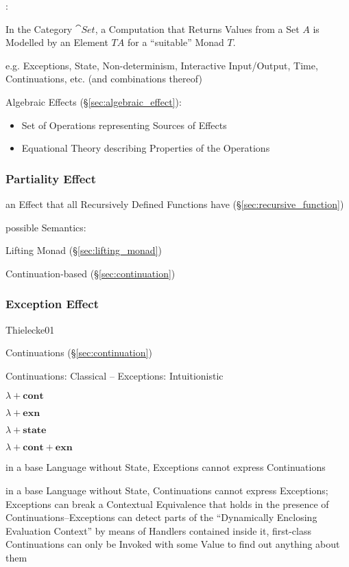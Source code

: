 \cite{plotkin-pretnar13}:

In the Category $\cat{Set}$, a Computation that Returns Values from a
Set $A$ is Modelled by an Element $T A$ for a ``suitable'' Monad $T$.

e.g. Exceptions, State, Non-determinism, Interactive Input/Output,
Time, Continuations, etc. (and combinations thereof)

Algebraic Effects (\S\ref{sec:algebraic_effect}):
\begin{itemize}
  \item Set of Operations representing Sources of Effects
  \item Equational Theory describing Properties of the Operations
\end{itemize}



\subsubsection{Partiality Effect}\label{sec:partiality_effect}

an Effect that all Recursively Defined Functions have
(\S\ref{sec:recursive_function})

possible Semantics:

Lifting Monad (\S\ref{sec:lifting_monad})

Continuation-based (\S\ref{sec:continuation})



\subsubsection{Exception Effect}\label{sec:exception_effect}

Thielecke01

Continuations (\S\ref{sec:continuation})

Continuations: Classical -- Exceptions: Intuitionistic

$\lambda + \mathbf{cont}$

$\lambda + \mathbf{exn}$

$\lambda + \mathbf{state}$

$\lambda + \mathbf{cont} + \mathbf{exn}$

in a base Language without State, Exceptions cannot express
Continuations

in a base Language without State, Continuations cannot express
Exceptions; Exceptions can break a Contextual Equivalence that holds
in the presence of Continuations--Exceptions can detect parts of the
``Dynamically Enclosing Evaluation Context'' by means of Handlers
contained inside it, first-class Continuations can only be Invoked
with some Value to find out anything about them

